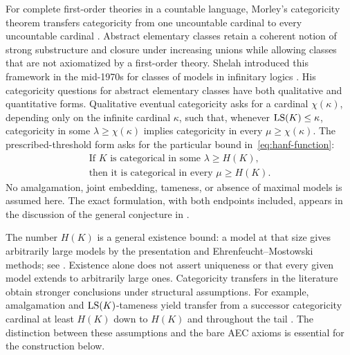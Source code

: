For complete first-order theories in a countable language, Morley's
categoricity theorem transfers categoricity from one uncountable
cardinal to every uncountable cardinal \cite{Morley1965}.
Abstract elementary classes retain a coherent notion of strong
substructure and closure under increasing unions while allowing classes
that are not axiomatized by a first-order theory. Shelah introduced
this framework in the mid-1970s for classes of models in infinitary logics
\cite[Section~2]{BoneyVasey2017Survey}.
His categoricity questions for abstract elementary classes have
both qualitative and quantitative forms. Qualitative eventual
categoricity asks for a cardinal \(\chi(\kappa)\), depending only on
the infinite cardinal \(\kappa\), such that, whenever
\(\operatorname{LS}(K)\le\kappa\), categoricity in some
\(\lambda\ge\chi(\kappa)\) implies categoricity in every
\(\mu\ge\chi(\kappa)\). The prescribed-threshold form asks for the
particular bound in~\eqref{eq:hanf-function}:
\begin{equation}\label{eq:target}
 \begin{gathered}
 \text{If \(K\) is categorical in some \(\lambda\ge H(K)\),}\\
 \text{then it is categorical in every \(\mu\ge H(K)\).}
 \end{gathered}
\end{equation}
No amalgamation, joint embedding, tameness, or absence of maximal
models is assumed here. The exact formulation, with both endpoints
included, appears in the discussion of the general conjecture in
\cite[Section~2.3]{SarochTrlifaj2024}.

The number \(H(K)\) is a general existence bound: a model at that size
gives arbitrarily large models by the presentation and
Ehrenfeucht--Mostowski methods; see
\cite[Claim~0.6]{Shelah1999CategoricityAP}.
Existence alone does not assert uniqueness or that every given model
extends to arbitrarily large ones. Categoricity transfers in the
literature obtain stronger conclusions under structural assumptions.
For example, amalgamation and \(\operatorname{LS}(K)\)-tameness yield transfer from a
successor categoricity cardinal at least \(H(K)\) down to \(H(K)\) and
throughout the tail \cite[Corollary~9.10]{Vasey2017Downward}.
The distinction between these assumptions and the bare AEC axioms is
essential for the construction below.


